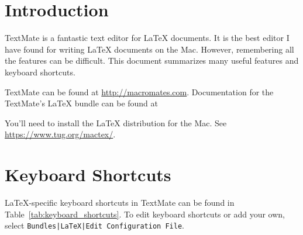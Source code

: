 \documentclass[10pt]{article}
\begin{document}
\maketitle

\begin{abstract}
TextMate is a fantastic editor for \LaTeX{} documents. 
This short paper summarizes many features, including
keyboard shortcuts, 
typsetting, and 
GitHub integration,
available in TextMate's \LaTeX{} bundle.
\end{abstract}

\section{Introduction}
TextMate is a fantastic text editor for \LaTeX{} documents.
It is the best editor I have found for
writing \LaTeX{} documents on the Mac.
However, remembering all the features can be difficult.
This document summarizes many useful features and keyboard shortcuts.

TextMate can be found at \url{http://macromates.com}. 
Documentation for the TextMate's \LaTeX{} bundle can be found at
\url{} 

You'll need to install the \LaTeX{} distribution for the Mac.
See \url{https://www.tug.org/mactex/}.


\section{Keyboard Shortcuts} %
\label{sec:keyboard_shortcuts}
\LaTeX{}-specific keyboard shortcuts in TextMate can be found in Table~\ref{tab:keyboard_shortcuts}.
To edit keyboard shortcuts or add your own, select
\texttt{Bundles|LaTeX|Edit Configuration File}.
\end{document}
